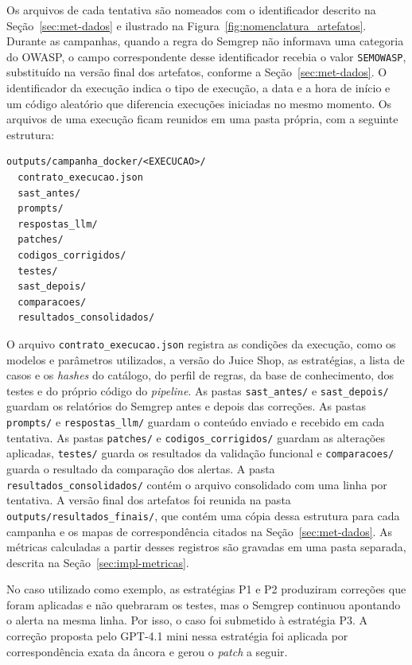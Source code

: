 Os arquivos de cada tentativa são nomeados com o identificador descrito na Seção~\ref{sec:met-dados} e ilustrado na Figura~\ref{fig:nomenclatura_artefatos}. Durante as campanhas, quando a regra do Semgrep não informava uma categoria do OWASP, o campo correspondente desse identificador recebia o valor \texttt{SEMOWASP}, substituído na versão final dos artefatos, conforme a Seção~\ref{sec:met-dados}. O identificador da execução indica o tipo de execução, a data e a hora de início e um código aleatório que diferencia execuções iniciadas no mesmo momento. Os arquivos de uma execução ficam reunidos em uma pasta própria, com a seguinte estrutura:

{\footnotesize
\begin{verbatim}
outputs/campanha_docker/<EXECUCAO>/
  contrato_execucao.json
  sast_antes/
  prompts/
  respostas_llm/
  patches/
  codigos_corrigidos/
  testes/
  sast_depois/
  comparacoes/
  resultados_consolidados/
\end{verbatim}
}

O arquivo \texttt{contrato\_execucao.json} registra as condições da execução, como os modelos e parâmetros utilizados, a versão do Juice Shop, as estratégias, a lista de casos e os \textit{hashes} do catálogo, do perfil de regras, da base de conhecimento, dos testes e do próprio código do \textit{pipeline}. As pastas \texttt{sast\_antes/} e \texttt{sast\_depois/} guardam os relatórios do Semgrep antes e depois das correções. As pastas \texttt{prompts/} e \texttt{respostas\_llm/} guardam o conteúdo enviado e recebido em cada tentativa. As pastas \texttt{patches/} e \texttt{codigos\_corrigidos/} guardam as alterações aplicadas, \texttt{testes/} guarda os resultados da validação funcional e \texttt{comparacoes/} guarda o resultado da comparação dos alertas. A pasta \texttt{resultados\_consolidados/} contém o arquivo consolidado com uma linha por tentativa. A versão final dos artefatos foi reunida na pasta \texttt{outputs/resultados\_finais/}, que contém uma cópia dessa estrutura para cada campanha e os mapas de correspondência citados na Seção~\ref{sec:met-dados}. As métricas calculadas a partir desses registros são gravadas em uma pasta separada, descrita na Seção~\ref{sec:impl-metricas}.

No caso utilizado como exemplo, as estratégias P1 e P2 produziram correções que foram aplicadas e não quebraram os testes, mas o Semgrep continuou apontando o alerta na mesma linha. Por isso, o caso foi submetido à estratégia P3. A correção proposta pelo GPT-4.1 mini nessa estratégia foi aplicada por correspondência exata da âncora e gerou o \textit{patch} a seguir.

